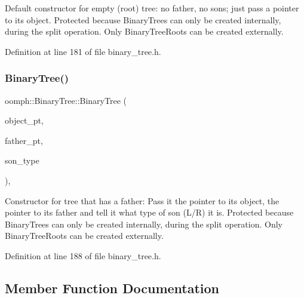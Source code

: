 Default constructor for empty (root) tree\+: no father, no sons; just pass a pointer to its object. Protected because Binary\+Trees can only be created internally, during the split operation. Only Binary\+Tree\+Roots can be created externally. 



Definition at line 181 of file binary\+\_\+tree.\+h.

\mbox{\label{classoomph_1_1BinaryTree_a1e1f22c07b554709b8aa76356d9f005f}} 
\subsubsection{\texorpdfstring{Binary\+Tree()}{BinaryTree()}\hspace{0.1cm}{\footnotesize\ttfamily [4/4]}}
{\footnotesize\ttfamily oomph\+::\+Binary\+Tree\+::\+Binary\+Tree (\begin{DoxyParamCaption}\item[{\hyperlink{classoomph_1_1RefineableElement}{Refineable\+Element} $\ast$const \&}]{object\+\_\+pt,  }\item[{\hyperlink{classoomph_1_1Tree}{Tree} $\ast$const \&}]{father\+\_\+pt,  }\item[{const int \&}]{son\+\_\+type }\end{DoxyParamCaption})\hspace{0.3cm}{\ttfamily [inline]}, {\ttfamily [protected]}}



Constructor for tree that has a father\+: Pass it the pointer to its object, the pointer to its father and tell it what type of son (L/R) it is. Protected because Binary\+Trees can only be created internally, during the split operation. Only Binary\+Tree\+Roots can be created externally. 



Definition at line 188 of file binary\+\_\+tree.\+h.



\subsection{Member Function Documentation}
\mbox{\label{classoomph_1_1BinaryTree_adeb5fdb3cc2b86827622586c42afba37}} 
